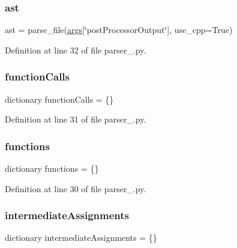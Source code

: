 \mbox{\label{namespaceparser__1_a83d838e3813fb5999c0492e0d9474bd9}} 
\subsubsection{\texorpdfstring{ast}{ast}}
{\footnotesize\ttfamily ast = parse\+\_\+file(\hyperlink{namespaceparser__1_a8187411843a6284ffb964ef3fb9fcab3}{args}\mbox{[}\char`\"{}post\+Processor\+Output\char`\"{}\mbox{]}, use\+\_\+cpp=True)}



Definition at line 32 of file parser\+\_.\+py.

\mbox{\label{namespaceparser__1_a8915929c38e1651aaa8c716f8f8a2f0f}} 
\subsubsection{\texorpdfstring{function\+Calls}{functionCalls}}
{\footnotesize\ttfamily dictionary function\+Calls = \{\}}



Definition at line 31 of file parser\+\_.\+py.

\mbox{\label{namespaceparser__1_ac310aa598d85b31cc0acea80dcc3c083}} 
\subsubsection{\texorpdfstring{functions}{functions}}
{\footnotesize\ttfamily dictionary functions = \{\}}



Definition at line 30 of file parser\+\_.\+py.

\mbox{\label{namespaceparser__1_a91478035202a21bdb18a2e8f291ab7b5}} 
\subsubsection{\texorpdfstring{intermediate\+Assignments}{intermediateAssignments}}
{\footnotesize\ttfamily dictionary intermediate\+Assignments = \{\}}



